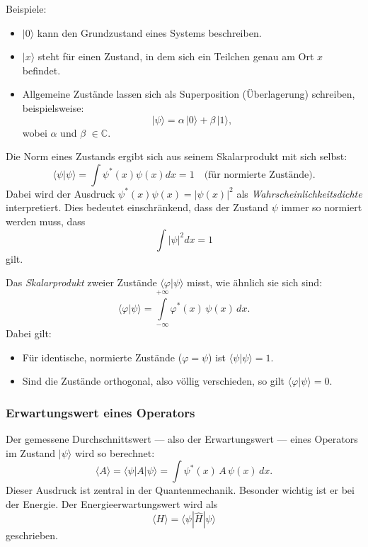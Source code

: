 		Beispiele:
		\begin{itemize}
		\item $|0\rangle$ kann den Grundzustand eines Systems beschreiben.
		\item $|x\rangle$ steht für einen Zustand, in dem sich ein Teilchen genau am Ort $x$ befindet.
		\item Allgemeine Zustände lassen sich als Superposition (Überlagerung) schreiben, beispielsweise:
		\[
			|\psi\rangle = \alpha\,|0\rangle + \beta\,|1\rangle,
		\]
		wobei $\alpha$ und $\beta$ $\in \mathbb{C}$.
		\end{itemize}

		Die Norm eines Zustands ergibt sich aus seinem Skalarprodukt mit sich selbst:
		\begin{equation}
			\langle \psi | \psi \rangle = \int \psi^*(x)\psi(x)dx = 1 \quad \text{(für normierte Zustände)}.
		\end{equation}
		Dabei wird der Ausdruck $\psi^*(x)\psi(x) = |\psi(x)|^2$ als \emph{Wahrscheinlichkeitsdichte} interpretiert.
		Dies bedeutet einschränkend, dass der Zustand $\psi$ immer so normiert werden muss, dass
		\begin{equation}
			\int |\psi|^2 dx = 1
		\end{equation}
		gilt.

		Das \emph{Skalarprodukt} zweier Zustände $\langle \varphi | \psi \rangle$ misst, wie ähnlich sie sich sind:
		\begin{equation}
		\langle \varphi | \psi \rangle = \int\limits_{-\infty}^{+\infty} \varphi^*(x)\,\psi(x)\,dx.
		\end{equation}
		Dabei gilt:
		\begin{itemize}
			\item Für identische, normierte Zustände ($\varphi = \psi$) ist $\langle \psi | \psi \rangle = 1$.
			\item Sind die Zustände orthogonal, also völlig verschieden, so gilt $\langle \varphi | \psi \rangle  = 0$.
		\end{itemize}
	
	\subsubsection{Erwartungswert eines Operators\label{fourier:subsubsection:erwartungswertEinesOperators}}
		Der gemessene Durchschnittswert --- also der Erwartungswert --- eines Operators im Zustand $|\psi\rangle$ wird so berechnet:
		\begin{equation}
			\langle A \rangle = \langle \psi | A | \psi \rangle = \int \psi^*(x)\,A\,\psi(x)\,dx.
		\end{equation}
		Dieser Ausdruck ist zentral in der Quantenmechanik.
		Besonder wichtig ist er bei der Energie. Der Energieerwartungswert wird als
		\begin{equation}
			\langle H \rangle = \langle \psi|\hat{H}|\psi \rangle
		\end{equation}
		geschrieben.

